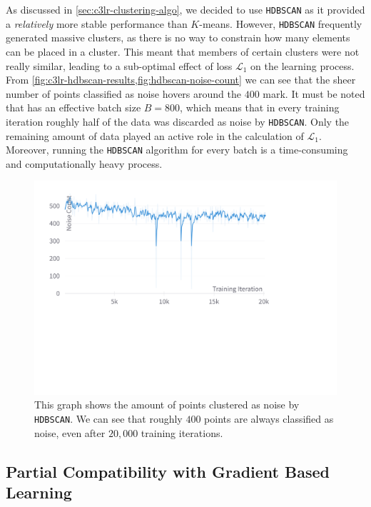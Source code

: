 As discussed in \cref{sec:c3lr-clustering-algo}, we decided to use \texttt{HDBSCAN} as it provided a \textit{relatively} more stable performance than $K$-means. However, \texttt{HDBSCAN} frequently generated massive clusters, as there is no way to constrain how many elements can be placed in a cluster. This meant that members of certain clusters were not really similar, leading to a sub-optimal effect of loss $\mathcal{L}_1$ on the learning process. From \cref{fig:c3lr-hdbscan-results,fig:hdbscan-noise-count} we can see that the sheer number of points classified as noise hovers around the $400$ mark. It must be noted that \ccclr{} has an effective batch size $B=800$, which means that in every training iteration roughly half of the data was discarded as noise by \texttt{HDBSCAN}. Only the remaining amount of data played an active role in the calculation of $\mathcal{L}_1$.
Moreover, running the \texttt{HDBSCAN} algorithm for every batch is a time-consuming and computationally heavy process.
\begin{figure}[ht]
    \centering
    \includegraphics[scale=0.15]{chapters/assets/c3lr_extra/noise_counts.pdf}
    \caption{This graph shows the amount of points clustered as noise by \texttt{HDBSCAN}. We can see that roughly $400$ points are always classified as noise, even after $20,000$ training iterations.}
    \label{fig:hdbscan-noise-count}
\end{figure}

\newpage
\subsection{Partial Compatibility with Gradient Based Learning}\label{ssec:c3lr-grad-based}

